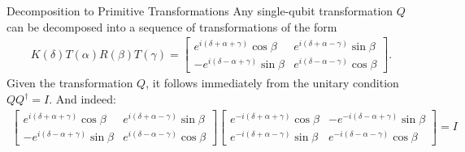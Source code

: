\documentclass{beamer}
\begin{document}
\begin{frame}{Decomposition to Primitive Transformations}
  {\tiny
    Any single-qubit transformation $Q$ can be decomposed into a sequence of transformations of the form
    \begin{align*}
      K(\delta)T(\alpha)R(\beta)T(\gamma) =
       \begin{bmatrix}
          e^{i(\delta + \alpha + \gamma)} \cos\beta & e^{i(\delta + \alpha - \gamma)} \sin\beta \\
         -e^{i(\delta - \alpha + \gamma)} \sin\beta & e^{i(\delta - \alpha - \gamma)} \cos\beta
       \end{bmatrix}.
    \end{align*}
    Given the transformation $Q$, it follows immediately from the unitary condition $QQ^{\dagger}=I$.
    And indeed:
    \begin{align*}
      \begin{bmatrix}
         e^{i(\delta + \alpha + \gamma)} \cos\beta & e^{i(\delta + \alpha - \gamma)} \sin\beta \\
        -e^{i(\delta - \alpha + \gamma)} \sin\beta & e^{i(\delta - \alpha - \gamma)} \cos\beta
      \end{bmatrix}
      \begin{bmatrix}
        e^{-i(\delta + \alpha + \gamma)} \cos\beta & -e^{-i(\delta - \alpha + \gamma)} \sin\beta \\
        e^{-i(\delta + \alpha - \gamma)} \sin\beta &  e^{-i(\delta - \alpha - \gamma)} \cos\beta
      \end{bmatrix} = I
    \end{align*}
  }%
\end{frame}
\end{document}
